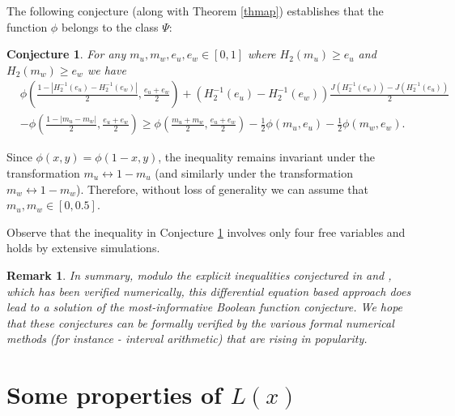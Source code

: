 \documentclass[conference,letterpaper,onecolumn]{IEEEtran}
\theoremstyle{plain}%
\newtheorem{rem}{Remark}
\newtheorem{conj}{Conjecture}
\begin{document}
The following conjecture (along with Theorem \ref{thmap})  establishes that the function $\phi$ belongs to the class $\Psi$:
\begin{conj}
    For any $m_u,m_w,e_u,e_w\in[0,1]$ where $H_2(m_u)\geq e_u$ and $H_2(m_w)\geq e_w$ we have \begin{align*}
        &\phi\left(\frac{1-|H_2^{-1}(e_u)-H_2^{-1}(e_w)|}{2},\frac{e_u + e_w}{2}\right)+
    (H_2^{-1}(e_u)-H_2^{-1}(e_w))\frac{J(H_2^{-1}(e_w)) - J(H_2^{-1}(e_u))}{2}\\&-\phi\left(\frac{1-|m_u-m_w|}{2},\frac{e_u + e_w}{2}\right)\geq \phi\left(\frac{m_u+m_w}{2},\frac{e_u+e_w}{2}\right)-  \frac 12 \phi(m_u,e_u) - \frac 12 \phi(m_w,e_w).
    \end{align*}
    \label{newconj}
\end{conj}
Since $\phi(x,y)=\phi(1-x,y)$, the inequality remains invariant under the transformation $m_u\leftrightarrow 1-m_u$ (and similarly under the transformation $m_w\leftrightarrow 1-m_w$). Therefore, without loss of generality we can assume that $m_u,m_w\in[0,0.5]$.

Observe that the inequality in Conjecture \ref{newconj} involves only four free variables and holds by extensive simulations. 


\begin{rem}
    In summary, modulo the explicit inequalities conjectured in  and , which has been verified numerically, this differential equation based approach does lead to a solution of the most-informative Boolean function conjecture. We hope that these conjectures can be formally verified by the various formal numerical methods (for instance - interval arithmetic) that are rising in popularity.
\end{rem}



\section{Some properties of $L(x)$}\label{appendixB}
\end{document}
